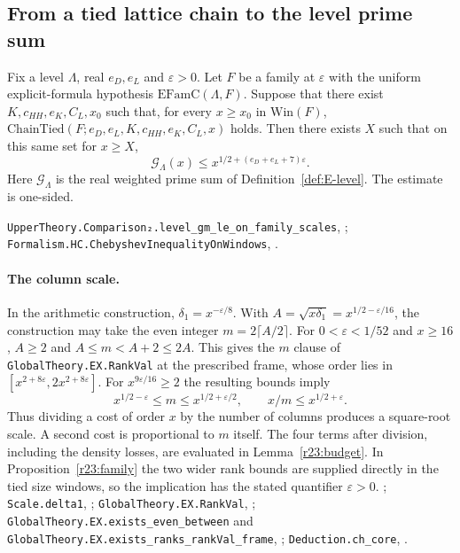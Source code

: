 \subsection{From a tied lattice chain to the level prime sum}\label{r23:p017}

\begin{proposition}\label{r23:family}
Fix a level $\Lambda$, real $e_D,e_L$ and $\varepsilon>0$. Let $F$ be a
family at $\varepsilon$ with the uniform explicit-formula hypothesis
$\mathrm{EFamC}(\Lambda,F)$. Suppose that there exist $K,c_{HH},e_K,C_L,x_0$
such that, for every $x\ge x_0$ in $\mathrm{Win}(F)$,
$\mathrm{ChainTied}(F;e_D,e_L,K,c_{HH},e_K,C_L,x)$ holds.
Then there exists $X$ such that on this same set for $x\ge X$,
\[
     \mathcal G_\Lambda(x)\le x^{1/2+(e_D+e_L+7)\varepsilon}.
\]
Here $\mathcal G_\Lambda$ is the real weighted prime sum of
Definition~\ref{def:E-level}. The estimate is one-sided.
\end{proposition}
\noindent\nolinkurl{UpperTheory.Comparison₂.level_gm_le_on_family_scales},
;
\nolinkurl{Formalism.HC.ChebyshevInequalityOnWindows},
.

\paragraph{The column scale.}
In the arithmetic construction, $\delta_1=x^{-\varepsilon/8}$. With
$A=\sqrt{x\delta_1}=x^{1/2-\varepsilon/16}$, the construction may take
the even integer $m=2\lceil A/2\rceil$. For $0<\varepsilon<1/52$
and $x\ge16$, $A\ge2$ and $A\le m<A+2\le2A$. This gives the $m$ 
clause of \nolinkurl{GlobalTheory.EX.RankVal} at the prescribed frame, whose
order lies in $[x^{2+8\varepsilon},2x^{2+8\varepsilon}]$.
For $x^{9\varepsilon/16}\ge2$ the resulting bounds imply
\[
    x^{1/2-\varepsilon}\le m\le x^{1/2+\varepsilon/2},\qquad
    x/m\le x^{1/2+\varepsilon}.
\]
Thus dividing a cost of order $x$ by the number of columns produces a
square-root scale. A second cost is proportional to $m$ itself. The four
terms after division, including the density losses, are evaluated in
Lemma~\ref{r23:budget}. In Proposition~\ref{r23:family} the two wider rank
bounds are supplied directly in the tied size windows, so the implication
has the stated quantifier $\varepsilon>0$.
;
\nolinkurl{Scale.delta1}, ;
\nolinkurl{GlobalTheory.EX.RankVal}, ;
\nolinkurl{GlobalTheory.EX.exists_even_between} and
\nolinkurl{GlobalTheory.EX.exists_ranks_rankVal_frame},
;
\nolinkurl{Deduction.ch_core}, .

